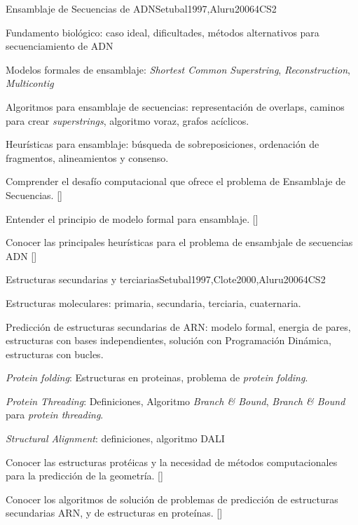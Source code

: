 \begin{syllabus}
\begin{unit}{Ensamblaje de Secuencias de ADN}{}{Setubal1997,Aluru2006}{4}{CS2}
\begin{topics}
    \item Fundamento biológico: caso ideal, dificultades, métodos alternativos para secuenciamiento de ADN
    \item Modelos formales de ensamblaje: \textit{Shortest Common Superstring}, \textit{Reconstruction}, \textit{Multicontig}
    \item Algoritmos para ensamblaje de secuencias: representación de overlaps, caminos para crear \textit{superstrings}, algoritmo voraz, grafos acíclicos.
    \item Heurísticas para ensamblaje: búsqueda de sobreposiciones, ordenación de fragmentos, alineamientos y consenso.
\end{topics}

\begin{learningoutcomes}
    \item Comprender el desafío computacional que ofrece el problema de Ensamblaje de Secuencias. [\Familiarity]
    \item Entender el principio de modelo formal para ensamblaje. [\Assessment]
    \item Conocer las principales heurísticas para el problema de ensambjale de secuencias ADN [\Usage]
\end{learningoutcomes}
\end{unit}

\begin{unit}{Estructuras secundarias y terciarias}{}{Setubal1997,Clote2000,Aluru2006}{4}{CS2}
   \begin{topics}
        \item Estructuras moleculares: primaria, secundaria, terciaria, cuaternaria.
        \item Predicción de estructuras secundarias de ARN: modelo formal, energia de pares, estructuras con bases independientes, solución con Programación Dinámica, estructuras con bucles.
        \item \textit{Protein folding}: Estructuras en proteinas, problema de \textit{protein folding}.
        \item \textit{Protein Threading}: Definiciones, Algoritmo \textit{Branch \& Bound}, \textit{Branch \& Bound} para \textit{protein threading}.
        \item \textit{Structural Alignment}: definiciones, algoritmo DALI
   \end{topics}
   \begin{learningoutcomes}
        \item Conocer las estructuras protéicas y la necesidad de métodos computacionales para la predicción de la geometría. [\Familiarity]
        \item Conocer los algoritmos de solución de problemas de predicción de estructuras secundarias ARN, y de estructuras en proteínas. [\Assessment]
   \end{learningoutcomes}
\end{unit}


\end{syllabus}
